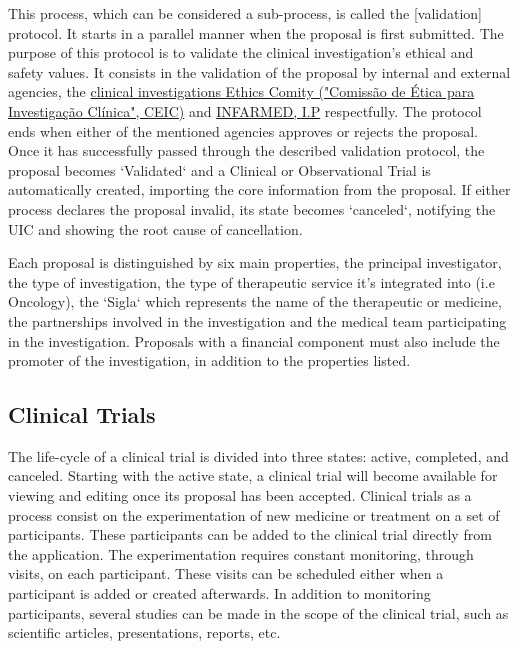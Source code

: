 This process, which can be considered a sub-process, is called the [validation] protocol. It starts in a parallel manner when the proposal is first submitted.  
The purpose of this protocol is to validate the clinical investigation's ethical and safety values. It consists in the validation of the proposal by internal and external agencies, the \href{https://www.ceic.pt/}{clinical investigations Ethics Comity ("Comissão de Ética para Investigação Clínica", CEIC)} and \href{https://www.infarmed.pt/web/infarmed}{INFARMED, I.P} respectfully. The protocol ends when either of the mentioned agencies approves or rejects the proposal.  
Once it has successfully passed through the described validation protocol, the proposal becomes `Validated` and a Clinical or Observational Trial is automatically created, importing the core information from the proposal.  
If either process declares the proposal invalid, its state becomes `canceled`, notifying the UIC and showing the root cause of cancellation.

Each proposal is distinguished by six main properties, the principal investigator, the type of investigation, the type of therapeutic service it's integrated into (i.e Oncology), the `Sigla` which represents the name of the therapeutic or medicine, the partnerships involved in the investigation and the medical team participating in the investigation.  
Proposals with a financial component must also include the promoter of the investigation, in addition to the properties listed.  

\subsection{Clinical Trials} 
\label{subsec:clinical-trials}
The life-cycle of a clinical trial is divided into three states: active, completed, and canceled.  
Starting with the active state, a clinical trial will become available for viewing and editing once its proposal has been accepted. 
Clinical trials as a process consist on the experimentation of new medicine or treatment on a set of participants. These participants can be added to the clinical trial directly from the application. The experimentation requires constant monitoring, through visits, on each participant. These visits can be scheduled either when a participant is added or created afterwards.  
In addition to monitoring participants, several studies can be made in the scope of the clinical trial, such as scientific articles, presentations, reports, etc. 
